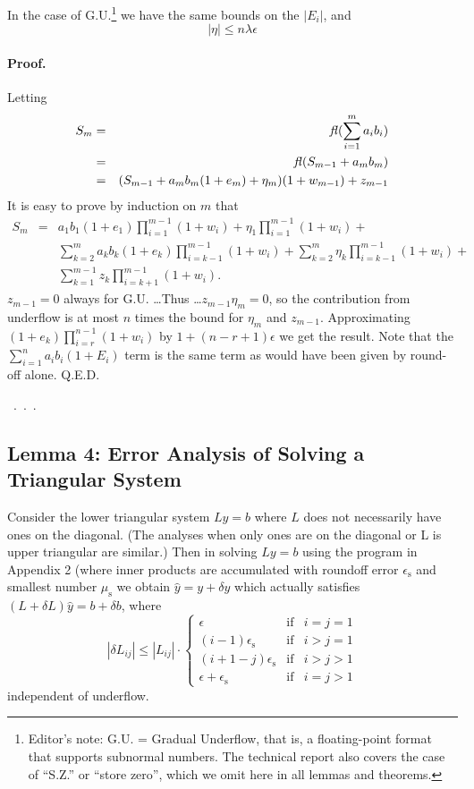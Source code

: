 \documentclass[a4paper]{article}
\begin{document}
In the case of G.U.\footnote{Editor's note: G.U. = Gradual Underflow, that is,
a floating-point format that supports subnormal numbers.  The technical report also covers the case of ``S.Z.'' or ``store zero'', which we omit here in all lemmas and theorems.}
we have the same bounds on the $|E_i|$, and
\begin{equation}\tag{34}
|\eta| \le n \lambda \epsilon
\end{equation}

\paragraph*{Proof.} Letting
\begin{eqnarray*}
  S_m & = & \mathit{fl}(\sum_{i=1}^m a_i b_i) \\
  & = & \mathit{fl}(S_{m-1} + a_m b_m) \\
  & = & (S_{m-1} + a_m b_m(1+e_m)+\eta_m)(1+w_{m-1})+z_{m-1}
\end{eqnarray*}
It is easy to prove by induction on $m$ that
\begin{eqnarray*}
  S_m & = & a_1b_1(1+e_1)\prod_{i=1}^{m-1}(1+w_i)+\eta_1 \prod_{i=1}^{m-1}(1+w_i)+\\
  & & \sum_{k=2}^m a_k b_k (1+e_k)\prod_{i=k-1}^{m-1}(1+w_i)+
  \sum_{k=2}^m \eta_k \prod_{i=k-1}^{m-1}(1+w_i) +\\
  & & \sum_{k=1}^{m-1}z_k \prod_{i=k+1}^{m-1}(1+w_i).
\end{eqnarray*}
$z_{m-1}=0$ always for G.U. \ldots Thus \ldots $z_{m-1}\eta_m = 0$, so the
contribution from underflow is at most $n$ times the bound for $\eta_m$
and $z_{m-1}$.  Approximating $(1+e_k)\prod_{i=r}^{n-1}(1+w_i)$ by
$1+(n-r+1)\epsilon$ we get the result.  Note that the $\sum_{i=1}^n a_i b_i(1+E_i)$
term is the same term as would have been given by round-off alone.  Q.E.D.

~.~.~.

\subsection*{Lemma 4: Error Analysis of Solving a Triangular System}

Consider the lower triangular system $Ly=b$ where $L$ does not necessarily
have ones on the diagonal.  (The analyses when only ones are on the
diagonal or L is upper triangular are similar.)  Then in solving
$Ly=b$ using the program in Appendix 2 (where inner products are
accumulated with roundoff error $\epsilon_\mathrm{s}$ and
smallest number $\mu_\mathrm{s}$ we obtain $\hat{y}=y+\delta y$ which
actually satisfies $(L+\delta L)\hat{y}= b + \delta b$, where
\begin{equation}\tag{80}
  |\delta L_{ij}| \le |L_{ij}| \cdot \left\lbrace
  \begin{array}{lll}
    \epsilon & \mathrm{if} & i=j=1 \\
    (i-1)\epsilon_\mathrm{s} & \mathrm{if} & i>j=1 \\
    (i+1-j)\epsilon_\mathrm{s} & \mathrm{if} & i>j>1 \\
    \epsilon+\epsilon_\mathrm{s} & \mathrm{if} & i=j>1 
  \end{array}\right.
\end{equation}
independent of underflow.
\end{document}
